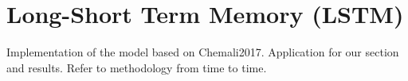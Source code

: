 \section{Long-Short Term Memory (LSTM)}\label{sec:LSTM}
Implementation of the model based on Chemali2017. Application for our section and results. Refer to methodology from time to time.